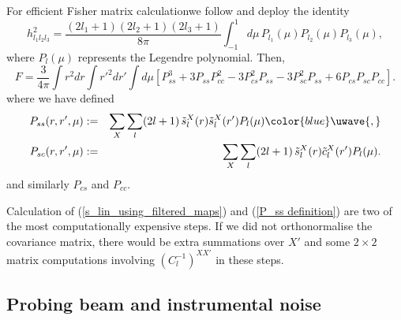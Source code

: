 \documentclass[a4paper,12pt,times,custombib,print,index]{Classes/PhDThesisPSnPDF} %
\providecommand{\DIFadd}[1]{{\protect\color{blue}\uwave{#1}}} %
\providecommand{\DIFaddbegin}{} %
\providecommand{\DIFaddend}{} %
\newcommand{\DIFaddincludegraphics}[2][]{{\color{blue}\fbox{\DIFOincludegraphics[#1]{#2}}}} %
\DeclareRobustCommand{\DIFaddbegin}{\DIFOaddbegin \let\includegraphics\DIFaddincludegraphics} %
\DeclareRobustCommand{\DIFaddend}{\DIFOaddend \let\includegraphics\DIFOincludegraphics} %
\begin{document}
For efficient Fisher matrix calculation\DIFaddbegin \DIFadd{, }\DIFaddend we follow \cite{Smith2011} and deploy the identity
\begin{equation}
	h_{l_1 l_2 l_3} ^2 = \frac{(2l_1 +1)(2l_2 +1)(2l_3 +1)}{8\pi} \int_{-1}^{1} d\mu \, P_{l_1}(\mu)P_{l_2}(\mu)P_{l_3}(\mu), \label{h}
\end{equation}
where $P_{l}(\mu)$ represents the Legendre polynomial. Then,
\begin{equation}
	F = \frac{3}{4\pi} \int r^2 dr \int r'^2 dr' \int d\mu \left[ P_{ss}^3 + 3 P_{ss} P_{cc}^2 - 3 P_{cs}^2 P_{ss} - 3 P_{sc}^2 P_{ss} + 6 P_{cs}P_{sc}P_{cc} \right].
\end{equation}
where we have defined
\begin{eqnarray}
	P_{ss}(r, r', \mu) &:=& \sum_{X} \sum_{l} (2l+1) \, \tilde{s}_l^X(r) \tilde{s}_l^X(r') P_l(\mu)\DIFaddbegin \DIFadd{, }\DIFaddend \nonumber \\
	P_{sc}(r, r', \mu) &:=& \sum_{X} \sum_{l} (2l+1) \, \tilde{s}_l^X(r) \tilde{c}_l^X(r') P_l(\mu).
	\label{P_ss definition}
\end{eqnarray}
and similarly $P_{cs}$ and $P_{cc}$.

Calculation of (\ref{s_lin_using_filtered_maps}) and (\ref{P_ss definition}) are two of the most computationally expensive steps. If we did not orthonormalise the covariance matrix, there would be extra summations over $X'$ and some $2\times2$ matrix computations involving $(C_l^{-1})^{XX'}$ in these steps.


\subsection{Probing beam and instrumental noise} \label{section:beam_and_noise}
\end{document}
